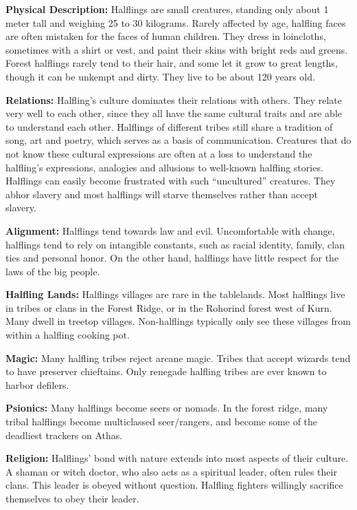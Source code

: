 \textbf{Physical Description:} Halflings are small creatures, standing only about 1 meter tall and weighing 25 to 30 kilograms. Rarely affected by age, halfling faces are often mistaken for the faces of human children. They dress in loincloths, sometimes with a shirt or vest, and paint their skins with bright reds and greens. Forest halflings rarely tend to their hair, and some let it grow to great lengths, though it can be unkempt and dirty. They live to be about 120 years old.

\textbf{Relations:} Halfling's culture dominates their relations with others. They relate very well to each other, since they all have the same cultural traits and are able to understand each other. Halflings of different tribes still share a tradition of song, art and poetry, which serves as a basis of communication. Creatures that do not know these cultural expressions are often at a loss to understand the halfling's expressions, analogies and allusions to well-known halfling stories. Halflings can easily become frustrated with such ``uncultured'' creatures. They abhor slavery and most halflings will starve themselves rather than accept slavery.

\textbf{Alignment:} Halflings tend towards law and evil. Uncomfortable with change, halflings tend to rely on intangible constants, such as racial identity, family, clan ties and personal honor. On the other hand, halflings have little respect for the laws of the big people.

\textbf{Halfling Lands:} Halflings villages are rare in the tablelands. Most halflings live in tribes or clans in the Forest Ridge, or in the Rohorind forest west of Kurn. Many dwell in treetop villages. Non-halflings typically only see these villages from within a halfling cooking pot.

\textbf{Magic:} Many halfling tribes reject arcane magic. Tribes that accept wizards tend to have preserver chieftains. Only renegade halfling tribes are ever known to harbor defilers.

\textbf{Psionics:} Many halflings become seers or nomads. In the forest ridge, many tribal halflings become multiclassed seer/rangers, and become some of the deadliest trackers on Athas.

\textbf{Religion:} Halflings' bond with nature extends into most aspects of their culture. A shaman or witch doctor, who also acts as a spiritual leader, often rules their clans. This leader is obeyed without question. Halfling fighters willingly sacrifice themselves to obey their leader.

